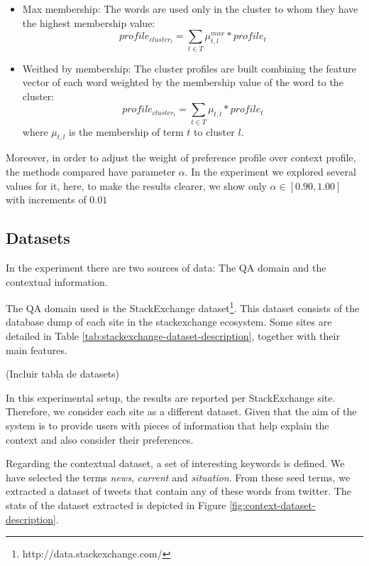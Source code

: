 \documentclass[preprint]{elsarticle}
\begin{document}
\begin{spacing}{1.5}
\begin{itemize}
	\item Max membership: The words are used only in the cluster to whom they have the highest membership value:
	\begin{equation}
		profile_{cluster_l} = \sum_{t \in T} \mu^{max}_{t,l} * profile_t
	\end{equation}

	\item Weithed by membership: The cluster profiles are built combining the feature vector of each word weighted by the membership value of the word to the cluster:
	\begin{equation}
		profile_{cluster_l} = \sum_{t \in T} \mu_{t,l} * profile_t
	\end{equation}
	\noindent where $\mu_{t,l}$ is the membership of term $t$ to cluster $l$.

\end{itemize}

Moreover, in order to adjust the weight of preference profile over context profile, the methods compared have parameter $\alpha$. In the experiment we explored several values for it, here, to make the results clearer, we show only $\alpha \in [0.90,1.00]$ with increments of $0.01$

\subsection{Datasets}
\label{sec:case-study-datasets}

In the experiment there are two sources of data: The QA domain and the contextual information.

The QA domain used is the StackExchange dataset\footnote{http://data.stackexchange.com/}. This dataset consists of the database dump of each site in the stackexchange ecosystem. Some sites are detailed in Table \ref{tab:stackexchange-dataset-description}, together with their main features.

(Incluir tabla de datasets)

In this experimental setup, the results are reported per StackExchange site. Therefore, we consider each site as a different dataset. Given that the aim of the system is to provide users with pieces of information that help explain the context and also consider their preferences.

Regarding the contextual dataset, a set of interesting keywords is defined. We have selected the terms \emph{news}, \emph{current} and \emph{situation}. From these seed terms, we extracted a dataset of tweets that contain any of these words from twitter. The stats of the dataset extracted is depicted in Figure \ref{fig:context-dataset-description}.


\end{spacing}
\end{document}
